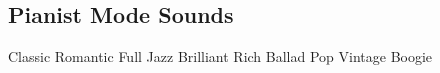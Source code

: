 \subsection{Pianist Mode Sounds}
Classic
Romantic
Full
Jazz
Brilliant
Rich
Ballad
Pop
Vintage
Boogie
